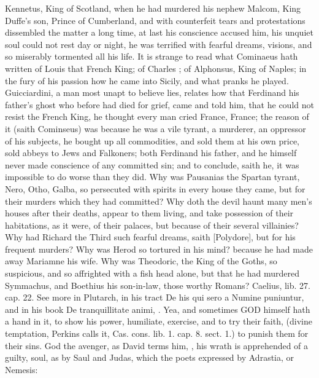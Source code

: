 {Kennetus, King of Scotland, when he had murdered his nephew
Malcom, King Duffe's son, Prince of Cumberland, and with counterfeit
tears and protestations dissembled the matter a long time, at
last his conscience accused him, his unquiet soul could not rest day or
night, he was terrified with fearful dreams, visions, and so miserably
tormented all his life. It is strange to read what Cominaeus hath
written of Louis  that French King; of Charles ; of Alphonsus,
King of Naples; in the fury of his passion how he came into Sicily, and
what pranks he played. Guicciardini, a man most unapt to believe lies,
relates how that Ferdinand his father's ghost who before had died for
grief, came and told him, that he could not resist the French King, he
thought every man cried France, France; the reason of it (saith
Cominseus) was because he was a vile tyrant, a murderer, an oppressor
of his subjects, he bought up all commodities, and sold them at his own
price, sold abbeys to Jews and Falkoners; both Ferdinand his father,
and he himself never made conscience of any committed sin; and to
conclude, saith he, it was impossible to do worse than they did. Why
was Pausanias the Spartan tyrant, Nero, Otho, Galba, so persecuted with
spirits in every house they came, but for their murders which they had
committed? Why doth the devil haunt many men's houses after their
deaths, appear to them living, and take possession of their
habitations, as it were, of their palaces, but because of their several
villainies? Why had Richard the Third such fearful dreams, saith
[Polydore], but for his frequent murders? Why was Herod so tortured in
his mind? because he had made away Mariamne his wife. Why was
Theodoric, the King of the Goths, so suspicious, and so affrighted with
a fish head alone, but that he had murdered Symmachus, and Boethius his
son-in-law, those worthy Romans? Caelius, \textlatin{lib. 27. cap. 22.} See more in
Plutarch, in his tract \textlatin{De his qui sero a Numine puniuntur}, and in his
book \textlatin{De tranquillitate animi}, \etc{}. Yea, and sometimes \textsc{GOD} himself hath a
hand in it, to show his power, humiliate, exercise, and to try their
faith, (divine temptation, Perkins calls it, \textlatin{Cas. cons. lib. 1. cap. 8.
sect. 1.}) to punish them for their sins. God the avenger, as
David terms him, , his wrath is apprehended of
a guilty, soul, as by Saul and Judas, which the poets expressed by
Adrastia, or Nemesis:

}
